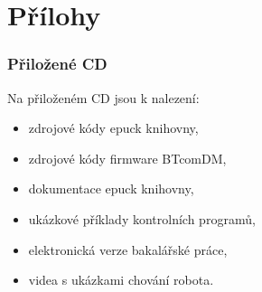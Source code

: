 \chapter*{Přílohy}

\subsection*{Přiložené CD}
Na přiloženém CD jsou k nalezení:
\begin{itemize}
    \item zdrojové kódy epuck knihovny,
    \item zdrojové kódy firmware BTcomDM,
    \item dokumentace epuck knihovny,
    \item ukázkové příklady kontrolních programů,
    \item elektronická verze bakalářské práce,
    \item videa s ukázkami chování robota.
\end{itemize}

